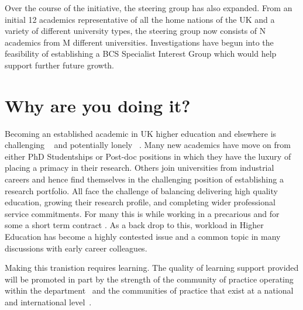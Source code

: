 \documentclass[sigconf]{acmart}
\begin{document}
Over the course of the initiative, the steering group has also expanded. From an initial 12 academics representative of all the home nations of the UK and a variety of different university types, the steering group now consists of N academics from M different universities. Investigations have begun into the feasibility of establishing a BCS Specialist Interest Group \cite{BCSSIG} which would help support further future growth.




\section{Why are you doing it?}
\label{sec:Why}
Becoming an established academic in UK higher education and elsewhere is challenging ~\cite{Thomas2015} and potentially lonely ~\cite{Foote2009}. Many new academics have move on from either PhD Studentships or Post-doc positions in which they have the luxury of placing a primacy in their research. Others join universities from industrial careers and hence find themselves in the challenging position of establishing a research portfolio. All face the challenge of balancing delivering high quality education, growing their research profile, and completing wider professional service commitments. For many this is while working in a precarious and for some a short term contract \cite{UCU,JaffeS}. As a back drop to this, workload in Higher Education has become a highly contested issue \cite{UCU2016}and a common topic in many discussions with early career colleagues.

Making this tranistion requires learning. The quality of learning support provided will be promoted in part by the strength of the community of practice operating within the department~\cite{Bolander2008} and the communities of practice that exist at a national and international level~\cite{Thomas2015}.
\end{document}
